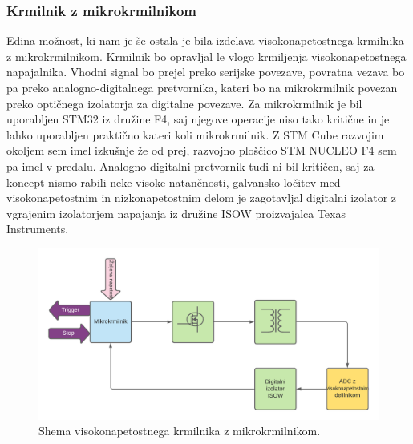 \documentclass[a4paper,twoside,openright,12pt,slovene]{book}
\begin{document}
	\subsubsection{Krmilnik z mikrokrmilnikom} \label{KrmilnikzUc}
Edina možnost, ki nam je še ostala je bila izdelava visokonapetostnega krmilnika z mikrokrmilnikom. Krmilnik bo opravljal le vlogo krmiljenja visokonapetostnega napajalnika. Vhodni signal bo prejel preko serijske povezave, povratna vezava bo pa preko analogno-digitalnega pretvornika, kateri bo na mikrokrmilnik povezan preko optičnega izolatorja za digitalne povezave. Za mikrokrmilnik je bil uporabljen STM32 iz družine F4, saj njegove operacije niso tako kritične in je lahko uporabljen praktično kateri koli mikrokrmilnik. Z STM Cube razvojim okoljem sem imel izkušnje že od prej, razvojno ploščico STM NUCLEO F4 sem pa imel v predalu. Analogno-digitalni pretvornik tudi ni bil kritičen, saj za koncept nismo rabili neke visoke natančnosti, galvansko ločitev med visokonapetostnim in nizkonapetostnim delom je zagotavljal digitalni izolator z vgrajenim izolatorjem napajanja iz družine ISOW proizvajalca Texas Instruments. 

	\begin{figure}[h]
    \centering
    \includegraphics[width=1\columnwidth]{Sheme/KrmilnikzuCElShema.pdf}
    \caption{\label{KrmilnikzuCElShema} Shema visokonapetostnega krmilnika z mikrokrmilnikom.}
	\end{figure}
\end{document}
